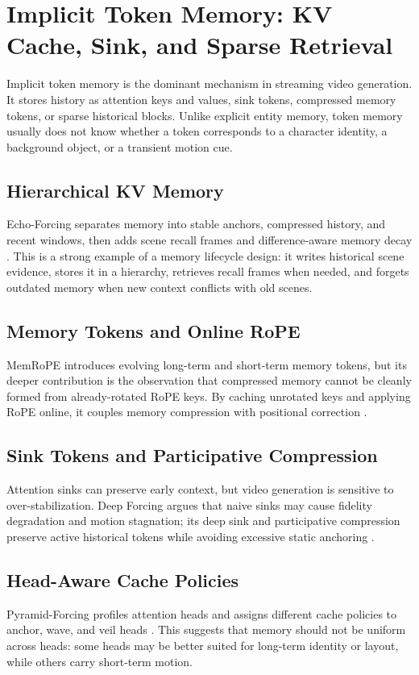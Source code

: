 \section{Implicit Token Memory: KV Cache, Sink, and Sparse Retrieval}

Implicit token memory is the dominant mechanism in streaming video generation. It stores history as attention keys and values, sink tokens, compressed memory tokens, or sparse historical blocks. Unlike explicit entity memory, token memory usually does not know whether a token corresponds to a character identity, a background object, or a transient motion cue.



\subsection{Hierarchical KV Memory}
Echo-Forcing separates memory into stable anchors, compressed history, and recent windows, then adds scene recall frames and difference-aware memory decay \citep{echoforcing2026}. This is a strong example of a memory lifecycle design: it writes historical scene evidence, stores it in a hierarchy, retrieves recall frames when needed, and forgets outdated memory when new context conflicts with old scenes.

\subsection{Memory Tokens and Online RoPE}
MemRoPE introduces evolving long-term and short-term memory tokens, but its deeper contribution is the observation that compressed memory cannot be cleanly formed from already-rotated RoPE keys. By caching unrotated keys and applying RoPE online, it couples memory compression with positional correction \citep{memrope2026}.

\subsection{Sink Tokens and Participative Compression}
Attention sinks can preserve early context, but video generation is sensitive to over-stabilization. Deep Forcing argues that naive sinks may cause fidelity degradation and motion stagnation; its deep sink and participative compression preserve active historical tokens while avoiding excessive static anchoring \citep{deepforcing2025}.

\subsection{Head-Aware Cache Policies}
Pyramid-Forcing profiles attention heads and assigns different cache policies to anchor, wave, and veil heads \citep{pyramidforcing2026}. This suggests that memory should not be uniform across heads: some heads may be better suited for long-term identity or layout, while others carry short-term motion.

